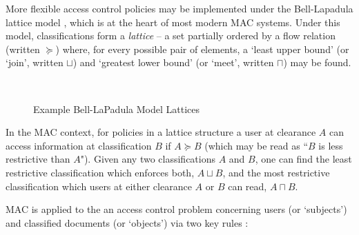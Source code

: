 More flexible access control policies may be implemented under the Bell-Lapadula lattice model \cite{bell1973lattice}, which is at the heart of most modern MAC systems. Under this model, classifications form a \textit{lattice} -- a set partially ordered by a flow relation (written $ \succeq $) where, for every possible pair of elements, a `least upper bound' (or `join', written $ \sqcup $) and `greatest lower bound' (or `meet', written $ \sqcap $) may be found.

\begin{figure}[h!]
	\centering
	\begin{subfigure}[t]{0.2\textwidth}
		\caption{}
	\end{subfigure}
	~
	\begin{subfigure}[t]{0.1\textwidth}
		\caption{}
	\end{subfigure}
	\caption{Example Bell-LaPadula Model Lattices}
	\label{fig:theory_lattice_diagrams}
\end{figure}



In the MAC context, for policies in a lattice structure a user at clearance $ A $ can access information at classification $ B $ if $ A \succeq B $ (which may be read as ``$ B $ is less restrictive than $ A $"). Given any two classifications $ A $ and $ B $, one can find the least restrictive classification which enforces both, $ A \sqcup B $, and the most restrictive classification which users at either clearance $ A $ or $ B $ can read, $ A \sqcap B $.

MAC is applied to the an access control problem concerning users (or `subjects') and classified documents (or `objects') via two key rules \cite{sandhu1993lattice}:

